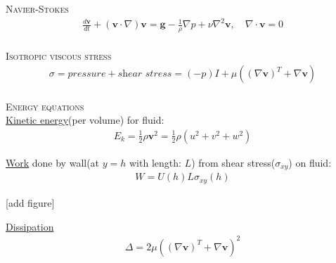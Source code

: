\documentclass[11pt,a4paper,english]{article}
\begin{document}
{\scshape Navier-Stokes} \\
\begin{align*}
\frac{d \mathbf{v}}{dt} + (\mathbf{v} \cdot \nabla)\mathbf{v} = \mathbf{g} - \frac{1}{\rho} \nabla p + \nu \nabla^2 \mathbf{v}, \quad \nabla \cdot \mathbf{v} = 0  
\end{align*}
\\[2ex]

{\scshape Isotropic viscous stress} \\
\begin{align*}
\sigma = pressure + \textit{shear stress} =  (-p)I + \mu ((\nabla \mathbf{v} )^T + \nabla \mathbf{v}  )
\end{align*}
\\[2ex]

{\scshape Energy equations} \\

\underline{Kinetic energy}(per volume) for fluid:
\begin{align*}
E_k = \frac{1}{2} \rho \mathbf{v}^2 = \frac{1}{2} \rho (u^2 + v^2 + w^2) 
\end{align*}

\underline{Work} done by wall(at $y=h$ with length: $L$) from shear stress($\sigma_{xy}$) on fluid:
\begin{align*}
W = U(h) L \sigma_{xy}(h)
\end{align*}

[add figure]

\underline{Dissipation}
\begin{align*}
\Delta = 2 \mu  ((\nabla \mathbf{v} )^T + \nabla \mathbf{v}  )^2
\end{align*}
\end{document}
